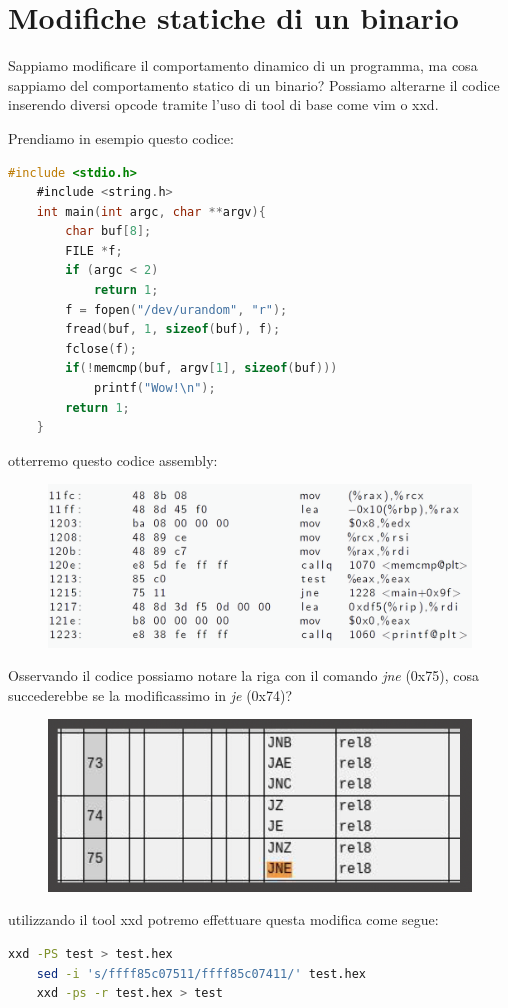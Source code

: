 \section{Modifiche statiche di un binario}
Sappiamo modificare il comportamento dinamico di un programma, ma cosa sappiamo del comportamento statico di un binario?
Possiamo alterarne il codice inserendo diversi opcode tramite l'uso di tool di base come vim o xxd.

Prendiamo in esempio questo codice:
\begin{lstlisting}[language=C]
    #include <stdio.h>
    #include <string.h>
    int main(int argc, char **argv){
        char buf[8];
        FILE *f;
        if (argc < 2)
            return 1;
        f = fopen("/dev/urandom", "r");
        fread(buf, 1, sizeof(buf), f);
        fclose(f);
        if(!memcmp(buf, argv[1], sizeof(buf)))
            printf("Wow!\n");
        return 1;
    }    
\end{lstlisting}

otterremo questo codice assembly:
\begin{figure}[h!]
    \centering
    \includegraphics[width=.6\linewidth]{res/static_modification_test.png}
    \caption{}
\end{figure}

Osservando il codice possiamo notare la riga con il comando \textit{jne} (0x75), cosa succederebbe se la modificassimo in \textit{je} (0x74)?
\begin{figure}[h!]
    \centering
    \includegraphics[width=.6\linewidth]{res/jump_table_code.png}
    \caption{}
\end{figure}

utilizzando il tool xxd potremo effettuare questa modifica come segue:
\begin{lstlisting}[language=bash]
    xxd -PS test > test.hex
    sed -i 's/ffff85c07511/ffff85c07411/' test.hex
    xxd -ps -r test.hex > test
\end{lstlisting}

